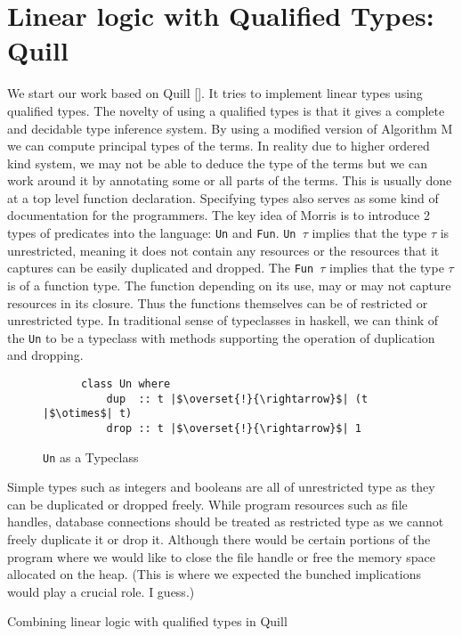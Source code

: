 \section{Linear logic with Qualified Types: Quill}
We start our work based on Quill [\cite{morris_best_2016}]. It tries
to implement linear types using qualified types. The novelty of using a qualified
types is that it gives a complete and decidable type inference system. By using
a modified version of Algorithm M we can compute principal types of the terms.
In reality due to higher ordered kind system, we may not be able to deduce the
type of the terms but we can work around it by annotating some or all parts of
the terms. This is usually done at a top level function declaration. Specifying types
also serves as some kind of documentation for the programmers.
The key idea of Morris is to introduce 2 types of predicates into the language: \texttt{Un} and \texttt{Fun}.
\texttt{Un $\tau$} implies that the type $\tau$ is unrestricted, meaning it does not
contain any resources or the resources that it captures can be easily duplicated and dropped.
The \texttt{Fun $\tau$} implies that the type $\tau$ is of a function type. The function
depending on its use, may or may not capture resources in its closure. Thus the functions
themselves can be of restricted or unrestricted type. In traditional sense of typeclasses
in haskell, we can think of the \texttt{Un} to be a typeclass with methods supporting the operation
of duplication and dropping.
\begin{figure}[h]
  \centering
  \begin{framed}
    \begin{verbatim}
      class Un where
          dup  :: t |$\overset{!}{\rightarrow}$| (t |$\otimes$| t)
          drop :: t |$\overset{!}{\rightarrow}$| 1
    \end{verbatim}
  \end{framed}
  \caption{\texttt{Un} as a Typeclass}
  \label{fig:un-typeclass}
\end{figure}

Simple types such as integers and booleans are all of unrestricted type as
they can be duplicated or dropped freely.
While program resources such as file handles, database connections
should be treated as restricted type as we cannot freely duplicate it
or drop it. Although there would be certain portions of the program where we would
like to close the file handle or free the memory space allocated on the heap.
(This is where we expected the bunched implications would play a crucial role. I guess.)

Combining linear logic with qualified types in Quill
